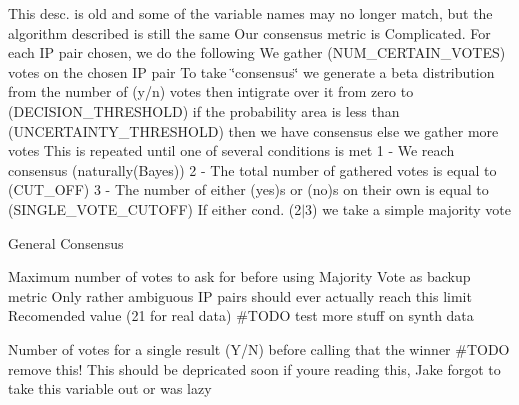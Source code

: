 This desc. is old and some of the variable names may no longer match, but the algorithm described is still the same Our consensus metric is Complicated. For each IP pair chosen, we do the following We gather (N\+U\+M\+\_\+\+C\+E\+R\+T\+A\+I\+N\+\_\+\+V\+O\+T\+ES) votes on the chosen IP pair To take \char`\"{}consensus\char`\"{} we generate a beta distribution from the number of (y/n) votes then intigrate over it from zero to (D\+E\+C\+I\+S\+I\+O\+N\+\_\+\+T\+H\+R\+E\+S\+H\+O\+LD) if the probability area is less than (U\+N\+C\+E\+R\+T\+A\+I\+N\+T\+Y\+\_\+\+T\+H\+R\+E\+S\+H\+O\+LD) then we have consensus else we gather more votes This is repeated until one of several conditions is met 1 -\/ We reach consensus (naturally(\+Bayes)) 2 -\/ The total number of gathered votes is equal to (C\+U\+T\+\_\+\+O\+FF) 3 -\/ The number of either (yes)s or (no)s on their own is equal to (S\+I\+N\+G\+L\+E\+\_\+\+V\+O\+T\+E\+\_\+\+C\+U\+T\+O\+FF) If either cond. (2$\vert$3) we take a simple majority vote

General Consensus

Maximum number of votes to ask for before using Majority Vote as backup metric Only rather ambiguous IP pairs should ever actually reach this limit Recomended value (21 for real data) \#\+T\+O\+DO test more stuff on synth data

Number of votes for a single result (Y/N) before calling that the winner \#\+T\+O\+DO remove this! This should be depricated soon if you\textquotesingle{}re reading this, Jake forgot to take this variable out or was lazy

